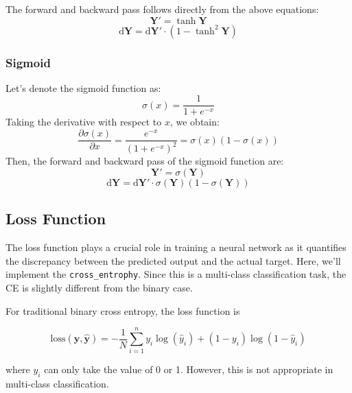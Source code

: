 \documentclass[10pt,a4paper,twoside]{tau}
\renewcommand{\vec}[1]{\mathbf{#1}}
\renewcommand{\d}{\text{d}}
\begin{document}
The forward and backward pass follows directly from the above equations:
\begin{equation}
\vec{Y'} = \tanh{\vec{Y}} \tag{3.2.5}
\end{equation}
\begin{equation}
\d\vec{Y} = \d\vec{Y'}\cdot(1 - \tanh^2\vec{Y}) \tag{3.2.6}
\end{equation}

\subsubsection{Sigmoid}

Let's denote the sigmoid function as:
\begin{equation}
\sigma(x) = \frac{1}{1 + e^{-x}} \tag{3.2.7}
\end{equation}
Taking the derivative with respect to $x$, we obtain:
\begin{equation}
\frac{\partial\sigma(x)}{\partial x} = \frac{e^{-x}}{(1 + e^{-x})^2} = \sigma(x)(1 - \sigma(x)) \tag{3.2.8}
\end{equation}
Then, the forward and backward pass of the sigmoid function are:
\begin{equation}
\vec{Y'} = \sigma(\vec{Y}) \tag{3.2.9}
\end{equation}
\begin{equation}
\d\vec{Y} = \d\vec{Y'}\cdot \sigma(\vec{Y}) (1 - \sigma(\vec{Y})) \tag{3.2.10}
\end{equation}

\subsection{Loss Function}

The loss function plays a crucial role in training a neural network as it quantifies the discrepancy between the predicted output and the actual target. Here, we'll implement the \texttt{cross\_entrophy}. Since this is a multi-class classification task, the CE is slightly different from the binary case.

For traditional binary cross entropy, the loss function is

\begin{equation}
    \text{loss}(\vec{y}, \vec{\hat{y}}) = -\frac{1}{N} \sum_{i=1}^{n}y_i
    \log(\hat{y}_i) + (1 - y_i) \log(1 - \hat{y}_i) \tag{3.3.1}
\end{equation}

where $y_i$ can only take the value of 0 or 1. However, this is not appropriate in multi-class classification.
\end{document}
